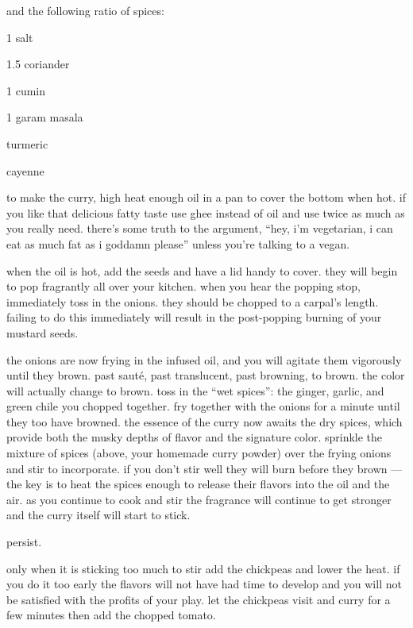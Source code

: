 and the following ratio of spices:

\begin{ingredients}
  \item 1	salt
  \item 1.5	coriander
  \item 1	cumin
  \item 1	garam masala
  \item \onequarter	turmeric
  \item \onehalf	cayenne
\end{ingredients}

to make the curry, high heat enough oil in a pan to cover the bottom when hot. 
if you like that delicious fatty taste use ghee instead of oil and use twice as 
much as you really need. there's some truth to the argument, ``hey, i'm 
vegetarian, i can eat as much fat as i goddamn please'' unless you're talking 
to a vegan.

when the oil is hot, add the seeds and have a lid handy to cover. they will 
begin to pop fragrantly all over your kitchen. when you hear the popping stop, 
immediately toss in the onions. they should be chopped to a carpal's length. 
failing to do this immediately will result in the post-popping burning of your 
mustard seeds.

the onions are now frying in the infused oil, and you will agitate them 
vigorously until they brown. past saut\'{e}, past translucent, past browning, 
to brown. the color will actually change to brown. toss in the ``wet spices'': 
the ginger, garlic, and green chile you chopped together. fry together with the 
onions for a minute until they too have browned. the essence of the curry now 
awaits the dry spices, which provide both the musky depths of flavor and the 
signature color. sprinkle the mixture of spices (above, your homemade curry 
powder) over the frying onions and stir to incorporate. if you don't stir well 
they will burn before they brown --- the key is to heat the spices enough to 
release their flavors into the oil and the air. as you continue to cook and 
stir the fragrance will continue to get stronger and the curry itself will 
start to stick.

persist.

only when it is sticking too much to stir add the chickpeas and lower the heat. 
if you do it too early the flavors will not have had time to develop and you 
will not be satisfied with the profits of your play. let the chickpeas visit 
and curry for a few minutes then add the chopped tomato.

